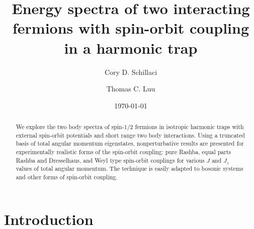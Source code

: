 \documentclass[%
 preprint,
 amsmath,amssymb,
 aps,
]{revtex4-1}
\begin{document}

\title{Energy spectra of two interacting fermions with spin-orbit coupling in a harmonic trap}%

\author{Cory D. Schillaci}
%

\author{Thomas C. Luu}%

\date{\today}%

\begin{abstract}
We explore the two body spectra of spin-$1/2$ fermions in isotropic harmonic traps with external spin-orbit potentials and short range two body interactions. Using a truncated basis of total angular momentum eigenstates, nonperturbative results are presented for experimentally realistic forms of the spin-orbit coupling: pure Rashba, equal parts Rashba and Dresselhaus, and Weyl type spin-orbit couplings for various $J$ and $J_z$ values of total angular momentum. The technique is easily adapted to bosonic systems and other forms of spin-orbit coupling.
\end{abstract}

\maketitle


\section{\label{sec:level1}Introduction}
\end{document}
